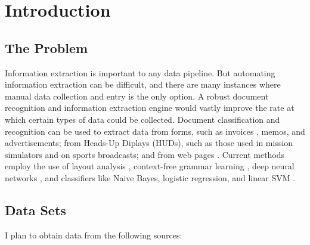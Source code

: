 \documentclass[twoside,11pt]{article}
\renewcommand{\>}{{\rightarrow}}
\newcommand{\1}{{\mathbf 1}}
\newcommand{\0}{{\mathbf 0}}
\begin{document}



\section{Introduction}

\subsection{The Problem}

Information extraction is important to any data pipeline. But automating information extraction can be difficult, and there are many instances where manual data collection and entry is the only option. A robust document recognition and information extraction engine would vastly improve the rate at which certain types of data could be collected. Document classification and recognition can be used to extract data from forms, such as invoices \cite{LiuWanZhang2016}, memos, and advertisements; from Heads-Up Diplays (HUDs), such as those used in mission simulators \cite{Guarino2013} and on sports broadcasts; and from web pages \cite{Gogar2016}. Current methods employ the use of layout analysis \cite{Dejean2015}, context-free grammar learning \cite{Thakur2012}, deep neural networks \cite{Gogar2016, Meerkamp2016, Kumar2017, Nguyen2017}, and classifiers like Naive Bayes, logistic regression, and linear SVM \cite{LiuWanZhang2016}.

\subsection{Data Sets}
I plan to obtain data from the following sources:
\end{document}
